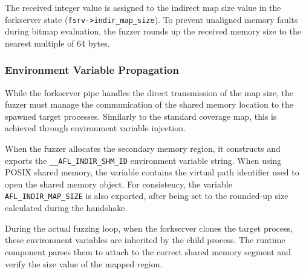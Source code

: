 The received integer value is assigned to the indirect map size value in the forkserver state (\texttt{fsrv->indir\_map\_size}). To prevent unaligned memory faults during bitmap evaluation, the fuzzer rounds up the received memory size to the nearest multiple of 64 bytes.

\subsubsection{Environment Variable Propagation}

While the forkserver pipe handles the direct transmission of the map size, the fuzzer must manage the communication of the shared memory location to the spawned target processes. Similarly to the standard coverage map, this is achieved through environment variable injection.

When the fuzzer allocates the secondary memory region, it constructs and exports the \texttt{\_\_AFL\_INDIR\_SHM\_ID} environment variable string. When using POSIX shared memory, the variable contains the virtual path identifier used to open the shared memory object. For consistency, the variable \texttt{AFL\_INDIR\_MAP\_SIZE} is also exported, after being set to the rounded-up size calculated during the handshake.

During the actual fuzzing loop, when the forkserver clones the target process, these environment variables are inherited by the child process. The runtime component parses them to attach to the correct shared memory segment and verify the size value of the mapped region.